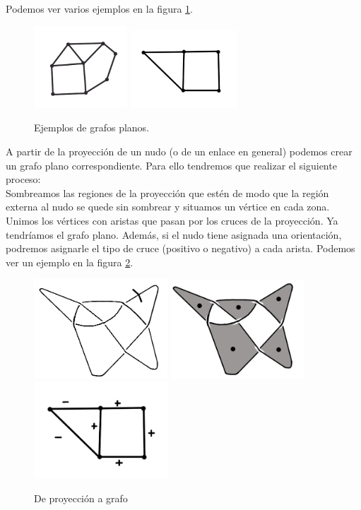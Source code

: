 \documentclass[14pt]{extarticle}
\begin{document}
Podemos ver varios ejemplos en la figura \ref{graf1}.\\
\begin{figure}[h!]
	\centering
	\includegraphics[width=3.5cm]{inudos/grafo.png}
	\includegraphics[width=4cm]{inudos/pgrafo.png}
	\caption{Ejemplos de grafos planos.}
	\label{graf1} 
\end{figure}

A partir de la proyección de un nudo (o de un enlace en general) podemos crear un grafo plano correspondiente. Para ello tendremos que realizar el siguiente proceso:\\

Sombreamos las regiones de la proyección que estén de modo que la región externa al nudo se quede sin sombrear y situamos un vértice en cada zona. Unimos los vértices con aristas que pasan por los cruces de la proyección. Ya tendríamos el grafo plano. Además, si el nudo tiene asignada una orientación, podremos asignarle el tipo de cruce (positivo o negativo) a cada arista. Podemos ver un ejemplo en la figura \ref{graf2}.\\
\begin{figure}[h!]
	\centering
	\includegraphics[width=5cm]{inudos/pgrafo3.png}
	\includegraphics[width=5cm]{inudos/pgrafo2.png}
	\includegraphics[width=5cm]{inudos/pgrafo1.png}
	\caption{De proyección a grafo}
	\label{graf2} 
\end{figure}
\end{document}
